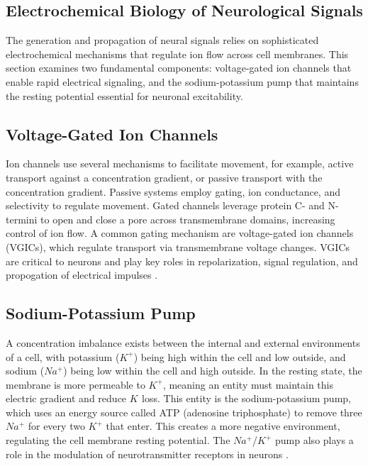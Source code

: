 \documentclass{article} %
\begin{document}
\begin{multicols}{2}
    
\section{Electrochemical Biology of Neurological Signals}
\label{app:b_electrochemical_biology}

The generation and propagation of neural signals relies on sophisticated electrochemical mechanisms that regulate ion flow across cell membranes. 
This section examines two fundamental components: voltage-gated ion channels that enable rapid electrical signaling, and the sodium-potassium pump that maintains the resting potential essential for neuronal excitability.

\subsection{Voltage-Gated Ion Channels}
\label{app:b_1_ion_channels}

Ion channels use several mechanisms to facilitate movement, for example, active transport against a concentration gradient, or passive transport with the concentration gradient. 
Passive systems employ gating, ion conductance, and selectivity to regulate movement. Gated channels leverage protein C- and N-termini to open and close a pore across transmembrane domains, increasing control of ion flow. 
A common gating mechanism are voltage-gated ion channels (VGICs), which regulate transport via transmembrane voltage changes. 
VGICs are critical to neurons and play key roles in repolarization, signal regulation, and propogation of electrical impulses \cite{rubaiy2017electrophysiology}. 

\subsection{Sodium-Potassium Pump}
\label{app:b_2_sodium_potassium_pump}

A concentration imbalance exists between the internal and external environments of a cell, with potassium ($K^{+}$) being high within the cell and low outside, and sodium ($Na^{+}$) being low within the cell and high outside. 
In the resting state, the membrane is more permeable to $K^{+}$, meaning an entity must maintain this electric gradient and reduce $K^{}$ loss. This entity is the sodium-potassium pump, which uses an energy source called ATP (adenosine triphosphate) to remove three $Na^{+}$ for every two $K^{+}$ that enter. 
This creates a more negative environment, regulating the cell membrane resting potential. 
The $Na^{+}$/$K^{+}$ pump also plays a role in the modulation of neurotransmitter receptors in neurons \cite{pivovarov2018na/kpump}. 


\end{multicols}
\end{document}
